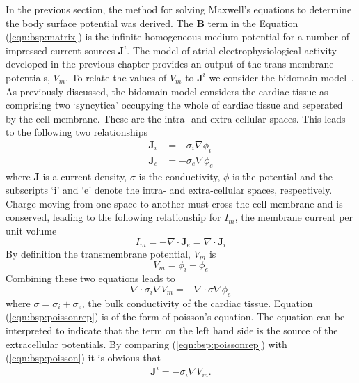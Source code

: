 In the previous section, the method for solving Maxwell's equations to determine
the body surface potential was derived.
The $\mathbf{B}$ term in the Equation (\ref{eqn:bsp:matrix}) is the infinite
homogeneous medium potential for a number of impressed current sources
$\mathbf{J}^i$.
The model of atrial electrophysiological activity developed in the previous
chapter provides an output of the trans-membrane potentials, $V_m$.
To relate the values of $V_m$ to $\mathbf{J}^i$ we consider the bidomain
model~\cite{Tung,otherguy,Geselowitz1989}.
As previously discussed, the bidomain model considers the cardiac tissue as
comprising two `syncytica' occupying the whole of cardiac tissue and seperated
by the cell membrane.
These are the intra- and extra-cellular spaces.
This leads to the following two relationships
\begin{align}
\label{eqn:bsp:bidomaini}
\mathbf{J}_i & = -\sigma_i \nabla \phi_i \\
\label{eqn:bsp:bidomaine}
\mathbf{J}_e & = -\sigma_e \nabla \phi_e
\end{align}
where $\mathbf{J}$ is a current density, $\sigma$ is the conductivity, $\phi$
is the potential and the subscripts `i' and `e' denote the intra- and
extra-cellular spaces, respectively.
Charge moving from one space to another must cross the cell membrane and is
conserved, leading to the following relationship for $I_m$, the membrane current per unit
volume
\begin{equation}
\label{eqn:bsp:im}
I_m = -\nabla\cdot\mathbf{J}_e = \nabla\cdot\mathbf{J}_i
\end{equation}
By definition the transmembrane potential, $V_m$ is
\begin{equation}
\label{eqn:bsp:tmp}
V_m = \phi_i - \phi_e
\end{equation}
Combining these two equations leads to
\begin{equation}
\label{eqn:bsp:poissonrep}
\nabla\cdot\sigma_i\nabla V_m = -\nabla\cdot\sigma\nabla\phi_e
\end{equation}
where $\sigma = \sigma_i + \sigma_e$, the bulk conductivity of the cardiac
tissue.
Equation (\ref{eqn:bsp:poissonrep}) is of the form of poisson's equation.
The equation can be interpreted to indicate that the term on the left hand side
is the source of the extracellular potentials.
By comparing (\ref{eqn:bsp:poissonrep}) with (\ref{eqn:bsp:poisson}) it is
obvious that
\begin{equation}
\label{eqn:bsp:ji}
\mathbf{J}^i = -\sigma_i\nabla V_m.
\end{equation}

